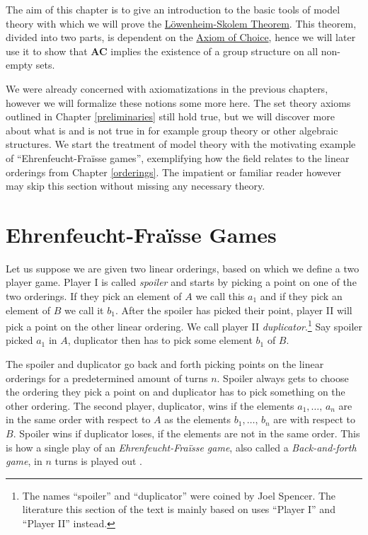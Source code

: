 \documentclass[../../main.tex]{subfiles}
\begin{document}
The aim of this chapter is to give an introduction to the basic tools of model theory with which we will prove the \hyperref[up-lowenheim-skolem]{Löwenheim-Skolem Theorem}.
This theorem, divided into two parts, is dependent on the \hyperref[choice-axiom]{Axiom of Choice}, 
hence we will later use it to show that \textbf{AC} implies the existence of a group structure on all non-empty sets.

We were already concerned with axiomatizations in the previous chapters, however we will formalize these notions some more here.
The set theory axioms outlined in Chapter \ref{preliminaries} still hold true, 
but we will discover more about what is and is not true in for example group theory or other algebraic structures.
We start the treatment of model theory with the motivating example of ``Ehrenfeucht-Fra\"isse games'', 
exemplifying how the field relates to the linear orderings from Chapter \ref{orderings}.
The impatient or familiar reader however may skip this section without missing any necessary theory.

\section{Ehrenfeucht-Fra\"isse Games}
Let us suppose we are given two linear orderings, based on which we define a two player game.
Player I is called \textit{spoiler} and starts by picking a point on one of the two orderings.
If they pick an element of $A$ we call this $a_1$ and if they pick an element of $B$ we call it $b_1$.
After the spoiler has picked their point, player II will pick a point on the other linear ordering. 
We call player II \textit{duplicator}.\footnote{The names ``spoiler'' and ``duplicator'' were coined by Joel Spencer.\cite[\S 6]{Wil24}
The literature \cite{Ros82} this section of the text is mainly based on uses ``Player I'' and ``Player II'' instead.}
Say spoiler picked $a_1$ in $A$, duplicator then has to pick some element $b_1$ of $B$.

The spoiler and duplicator go back and forth picking points on the linear orderings for a predetermined amount of turns $n$.
Spoiler always gets to choose the ordering they pick a point on and duplicator has to pick something on the other ordering.
The second player, duplicator, wins if the elements $a_1,\ldots,\, a_n$ are in the same order with respect to $A$ as the elements $b_1,\ldots,\, b_n$ are with respect to $B$.
Spoiler wins if duplicator loses, if the elements are not in the same order. 
This is how a single play of an \textit{Ehrenfeucht-Fra\"isse game}, also called a \textit{Back-and-forth game}, in $n$ turns is played out \cite[\S 6.1]{Ros82}.
\end{document}
